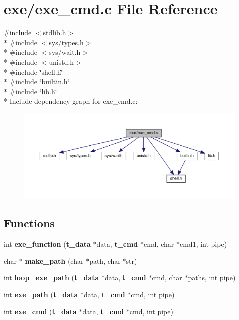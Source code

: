 \section{exe/exe\-\_\-cmd.c File Reference}
\label{exe__cmd_8c}
{\ttfamily \#include $<$stdlib.\-h$>$}\\*
{\ttfamily \#include $<$sys/types.\-h$>$}\\*
{\ttfamily \#include $<$sys/wait.\-h$>$}\\*
{\ttfamily \#include $<$unistd.\-h$>$}\\*
{\ttfamily \#include \char`\"{}shell.\-h\char`\"{}}\\*
{\ttfamily \#include \char`\"{}builtin.\-h\char`\"{}}\\*
{\ttfamily \#include \char`\"{}lib.\-h\char`\"{}}\\*
Include dependency graph for exe\-\_\-cmd.\-c\-:\nopagebreak
\begin{figure}[H]
\begin{center}
\leavevmode
\includegraphics[width=350pt]{exe__cmd_8c__incl}
\end{center}
\end{figure}
\subsection*{Functions}
\begin{DoxyCompactItemize}
\item 
int {\bf exe\-\_\-function} ({\bf t\-\_\-data} $\ast$data, {\bf t\-\_\-cmd} $\ast$cmd, char $\ast$cmd1, int pipe)
\item 
char $\ast$ {\bf make\-\_\-path} (char $\ast$path, char $\ast$str)
\item 
int {\bf loop\-\_\-exe\-\_\-path} ({\bf t\-\_\-data} $\ast$data, {\bf t\-\_\-cmd} $\ast$cmd, char $\ast$paths, int pipe)
\item 
int {\bf exe\-\_\-path} ({\bf t\-\_\-data} $\ast$data, {\bf t\-\_\-cmd} $\ast$cmd, int pipe)
\item 
int {\bf exe\-\_\-cmd} ({\bf t\-\_\-data} $\ast$data, {\bf t\-\_\-cmd} $\ast$cmd, int pipe)
\end{DoxyCompactItemize}


